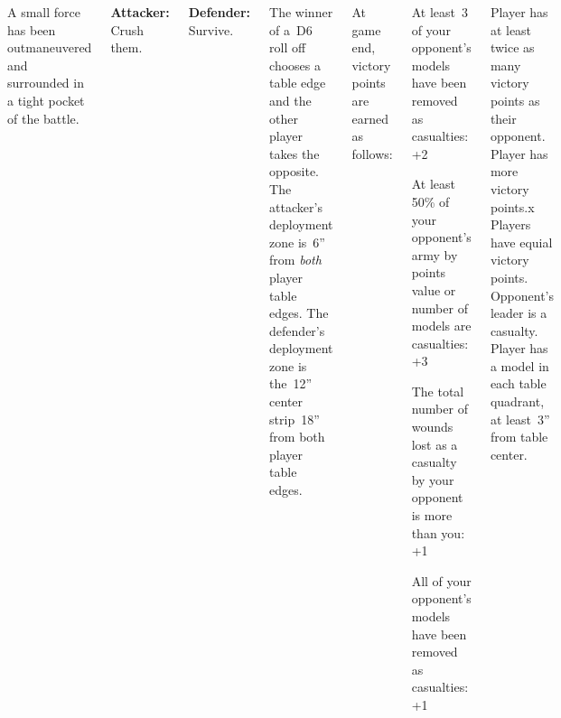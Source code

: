
\begin{columns}

  A small force has been outmaneuvered and surrounded in a tight
  pocket of the battle.

{\bf Attacker:} Crush them.

{\bf Defender:} Survive.

%

The winner of a~D6 roll off chooses a table edge and the other player
takes the opposite.  The attacker's deployment zone is~6'' from
\emph{both} player table edges.  The defender's deployment zone is
the~12'' center strip~18'' from both player table edges.


%

At game end, victory points are earned as follows:

\begin{squishitemize}
\item At least~3 of your opponent's models have been removed as
  casualties: +2

\item At least 50\% of your opponent's army by points value or number
  of models are casualties: +3

\item The total number of wounds lost as a casualty by your opponent
  is more than you: +1

\item All of your opponent's models have been removed as casualties:
  +1
\end{squishitemize}

\vspace*{-2pt}

\scoringbox%
{Player has at least twice as many victory points as their opponent.}%
{Player has more victory points.x}%
{Players have equial victory points.}%
{Opponent's leader is a casualty.}%
{Player has a model in each table quadrant, at least~3'' from table center.}

\end{columns}

